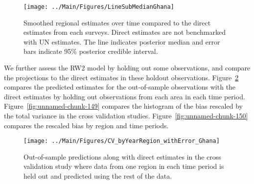 \documentclass[12pt]{article}\usepackage[]{graphicx}\usepackage[]{color}
\newenvironment{knitrout}{}{} %
\begin{document}
\begin{knitrout}
\color{fgcolor}\begin{figure}[bht]

{\centering \texttt{[image: ../Main/Figures/LineSubMedianGhana]} 

}

\caption[Smoothed regional estimates over time compared to the direct estimates from each surveys]{Smoothed regional estimates over time compared to the direct estimates from each surveys. Direct estimates are not benchmarked with UN estimates. The line indicates posterior median and error bars indicate 95\% posterior credible interval.}\label{fig:unnamed-chunk-147}
\end{figure}


\end{knitrout}
We further assess the RW2 model by holding out some observations, and compare the projections to the direct estimates in these holdout observations. Figure~\ref{fig:unnamed-chunk-148} compares the predicted estimates for the out-of-sample observations  with the direct estimates by holding out observations from each area in each time period.  Figure~\ref{fig:unnamed-chunk-149} compares the histogram of the bias rescaled by the total variance in the cross validation studies. Figure~\ref{fig:unnamed-chunk-150} compares the rescaled bias by region and time periods.



 
\begin{knitrout}
\color{fgcolor}\begin{figure}[bht]

{\centering \texttt{[image: ../Main/Figures/CV\_byYearRegion\_withError\_Ghana]} 

}

\caption[Out-of-sample predictions along with direct estimates in the cross validation study where data from one region in each time period is held out and predicted using the rest of the data]{Out-of-sample predictions along with direct estimates in the cross validation study where data from one region in each time period is held out and predicted using the rest of the data.}\label{fig:unnamed-chunk-148}
\end{figure}


\end{knitrout}
\end{document}
